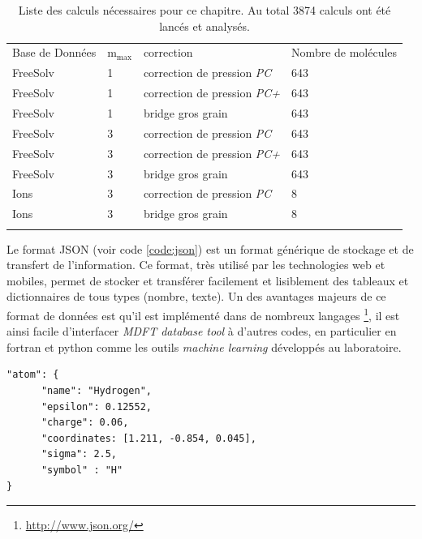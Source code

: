 \begin{table}[h]
  \begin{tabular}{l l l l}
    \hline & \\[-1em]\hline
    Base de Données & $\mathrm{m}_\mathrm{max}$   & correction & Nombre de molécules \\
    \hline
    FreeSolv  & 1 & correction de pression \textit{PC} & 643 \\
    FreeSolv  & 1 & correction de pression \textit{PC+} & 643 \\
    FreeSolv  & 1 & bridge gros grain & 643 \\
    FreeSolv  & 3 & correction de pression \textit{PC} & 643 \\
    FreeSolv  & 3 & correction de pression \textit{PC+} & 643 \\
    FreeSolv  & 3 & bridge gros grain & 643 \\
    \hline
    Ions  & 3 & correction de pression \textit{PC} & 8 \\
    Ions  & 3 & bridge gros grain & 8 \\
    \hline & \\[-1em]\hline
  \end{tabular}
  \caption[Liste des benchmark lancés.]{Liste des calculs nécessaires pour ce chapitre. Au total 3874 calculs ont été lancés et analysés.}
  \label{tab:calculs_lances}  
\end{table}



Le format JSON (voir code \ref{code:json}) est un format générique de stockage et de transfert de l'information. Ce format, très utilisé par les technologies web et mobiles, permet de stocker et transférer facilement et lisiblement des tableaux et dictionnaires de tous types (nombre, texte). Un des avantages majeurs de ce format de données est qu'il est implémenté dans de nombreux langages \footnote{\url{http://www.json.org/}}, il est ainsi facile d'interfacer \textit{MDFT database tool} à d'autres codes, en particulier en fortran et python comme les outils \textit{machine learning} développés au laboratoire. 


\begin{lstlisting}[caption={Exemple de fichier json. Ici on décrit un atome, son nom, son symbole, sa position ainsi que ses paramètres de champ de force.}, label={code:json},captionpos=b]
  "atom": {
      "name": "Hydrogen", 
      "epsilon": 0.12552, 
      "charge": 0.06, 
      "coordinates: [1.211, -0.854, 0.045],  
      "sigma": 2.5,
      "symbol" : "H"
}
\end{lstlisting}





